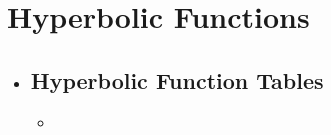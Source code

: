 \section{Hyperbolic Functions}
\begin{itemize}
  \item []

  \subsection{Hyperbolic Function Tables}
  \begin{itemize}
    \item
  \end{itemize}

\end{itemize}




